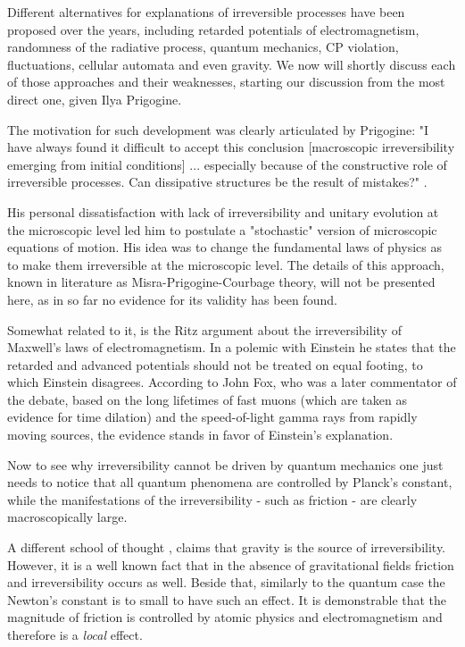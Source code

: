 \documentclass[a4paper,12pt]{article}
\begin{document}
Different alternatives for explanations of irreversible processes have been proposed over the years, including retarded potentials of electromagnetism, randomness of the radiative process, quantum mechanics, CP violation, fluctuations, cellular automata and even gravity. We now will shortly discuss each of those approaches and their weaknesses, starting our discussion from the most direct one, given Ilya Prigogine.

The motivation for such development was clearly articulated by Prigogine:
"I have always found it difficult to accept this conclusion [macroscopic irreversibility emerging from initial conditions] {...} especially because of the constructive role of irreversible processes. Can dissipative structures be the result of mistakes?" \cite{Prigogine:1978kz}.

His personal dissatisfaction with lack of irreversibility and unitary evolution at the microscopic level led him to postulate a "stochastic" version of microscopic equations of motion. His idea was to change the fundamental laws of physics as to make them irreversible at the microscopic level. The details of this approach, known in literature as Misra-Prigogine-Courbage theory\cite{Courbage:1983eo}, will not be presented here, as in so far no evidence for its validity has been found\cite{Bricmont:7zJsfTpK}.

Somewhat related to it, is the Ritz argument about the irreversibility of Maxwell's laws of electromagnetism. In a polemic with Einstein he states that the retarded and advanced potentials should not be treated on equal footing, to which Einstein disagrees. 
According to John Fox, who was a later commentator of the debate, based on the long lifetimes of fast muons (which are taken as evidence for time dilation) and the speed-of-light gamma rays from rapidly moving sources, the evidence stands in favor of Einstein's explanation\cite{Fox:1965bg}.

Now to see why irreversibility cannot be driven by quantum mechanics one just needs to notice that all quantum phenomena are controlled by Planck's constant, while the manifestations of the irreversibility - such as friction - are clearly macroscopically large. %

A different school of thought \cite{KIEFER2005, Barbour:2014hq}, %
claims that gravity is the source of irreversibility. However, it is a well known fact that in the absence of gravitational fields friction and irreversibility occurs as well. Beside that, similarly to the quantum case the Newton's constant is to small to have such an effect. It is demonstrable that the magnitude of friction is controlled by atomic physics and electromagnetism and therefore is a \textit{local} effect. 
\end{document}
